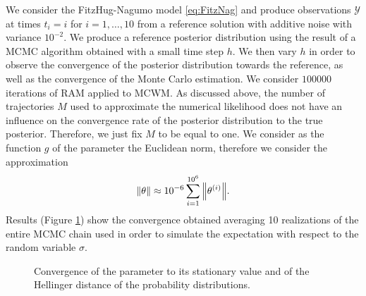 We consider the FitzHug-Nagumo model \eqref{eq:FitzNag} and produce observations $\mathcal{Y}$ at times $t_i = i$ for $i = 1, \ldots, 10$ from a reference solution with additive noise with variance $10^{-2}$. We produce a reference posterior distribution using the result of a MCMC algorithm obtained with a small time step $h$. We then vary $h$ in order to observe the convergence of the posterior distribution towards the reference, as well as the convergence of the Monte Carlo estimation. We consider $100000$ iterations of RAM applied to MCWM. As discussed above, the number of trajectories $M$ used to approximate the numerical likelihood does not have an influence on the convergence rate of the posterior distribution to the true posterior. Therefore, we just fix $M$ to be equal to one. We consider as the function $g$ of the parameter the Euclidean norm, therefore we consider the approximation
\begin{equation}
	\norm{\theta} \approx 10^{-6} \sum_{i = 1}^{10^6} \norm{\theta^{(i)}}.
\end{equation}
Results	(Figure \ref{fig:ConvergenceMCMC}) show the convergence obtained averaging 10 realizations of the entire MCMC chain used in order to simulate the expectation with respect to the random variable $\sigma$.

\begin{figure}[t]
	\centering
	\begin{subfigure}{0.49\linewidth}
		\centering
		\resizebox{1.0\linewidth}{!}{}
	\end{subfigure}
	\begin{subfigure}{0.49\linewidth}
		\centering
		\resizebox{1.0\linewidth}{!}{}
	\end{subfigure}
	\caption{Convergence of the parameter to its stationary value and of the Hellinger distance of the probability distributions.}
	\label{fig:ConvergenceMCMC}
\end{figure}


